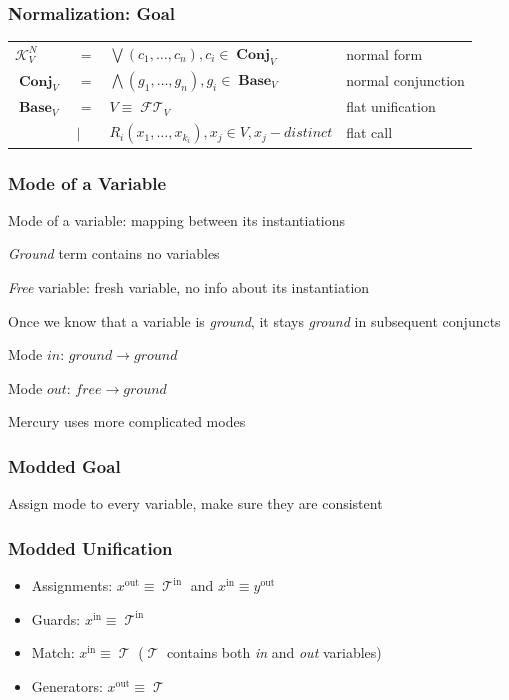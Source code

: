 \documentclass[xcolor=table]{beamer}
\DeclareMathOperator{\Term}{\mathcal{T}}
\DeclareMathOperator{\FlatTerm}{\mathcal{FT}}
\DeclareMathOperator{\Base}{\mathbf{Base}}
\DeclareMathOperator{\Conj}{\mathbf{Conj}}
\DeclareMathOperator{\inmode}{in}
\DeclareMathOperator{\outmode}{out}
\newcommand{\KanN}{\mathcal{K}^{N}}
\begin{document}
\begin{frame}[fragile]
  \frametitle{Normalization: Goal}
\begin{tabular}{llll}
$\KanN_{V}$ & $=$ & $\bigvee\left( c_1, \ldots, c_{n} \right), c_{i}\in \Conj_{V}$ & normal form \\
$\Conj_{V}$ & $=$ & $\bigwedge\left( g_1, \ldots, g_n \right), g_{i}\in \Base_{V}$ & normal conjunction \\
$\Base_{V}$ & $=$ & $V \equiv \FlatTerm_{V}$ & flat unification \\
            & $\mid$ & $R_{i}\left( x_1, \ldots, x_{k_{i}} \right), x_{j}\in V, x_j - distinct$ & flat call\\
\end{tabular}
\end{frame}


\begin{frame}[fragile]
  \frametitle{Mode of a Variable}
Mode of a variable: mapping between its instantiations

\vfill

\emph{Ground} term contains no variables

\emph{Free} variable: fresh variable, no info about its instantiation

Once we know that a variable is \emph{ground}, it stays \emph{ground} in subsequent conjuncts

\vfill

Mode $in$: $ground \rightarrow ground$

Mode $out$: $free \rightarrow ground$

\vfill

Mercury uses more complicated modes

\end{frame}

\begin{frame}[fragile]
  \frametitle{Modded Goal}
Assign mode to every variable, make sure they are consistent
\end{frame}

\begin{frame}[fragile]
  \frametitle{Modded Unification}

\begin{itemize}
    \item Assignments: $x^{\outmode}  \equiv \Term^{\inmode}$ and $x^{\inmode} \equiv y^{\outmode}$
    \item Guards: $x^{\inmode} \equiv \Term^{\inmode}$
    \item Match: $x^{\inmode} \equiv \Term$ ($\Term$ contains both \emph{in} and \emph{out} variables)
    \item Generators: $x^{\outmode} \equiv \Term$
\end{itemize}
\end{frame}
\end{document}

